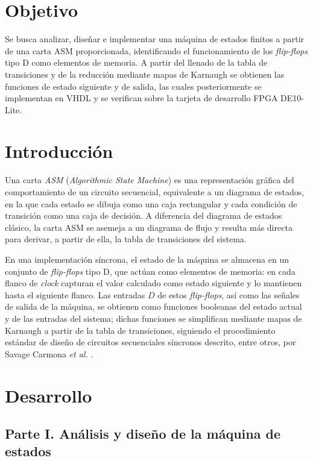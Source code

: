 \setcounter{page}{1}

\section{Objetivo}

Se busca analizar, diseñar e implementar una máquina de estados finitos a partir de una
carta ASM proporcionada, identificando el funcionamiento de los \textit{flip-flops} tipo
D como elementos de memoria. A partir del llenado de la tabla de transiciones y de la
reducción mediante mapas de Karnaugh se obtienen las funciones de estado siguiente y de
salida, las cuales posteriormente se implementan en VHDL y se verifican sobre la tarjeta
de desarrollo FPGA DE10-Lite.

\section{Introducción}

Una carta \textit{ASM} (\textit{Algorithmic State Machine}) es una representación
gráfica del comportamiento de un circuito secuencial, equivalente a un diagrama de
estados, en la que cada estado se dibuja como una caja rectangular y cada condición de
transición como una caja de decisión. A diferencia del diagrama de estados clásico, la
carta ASM se asemeja a un diagrama de flujo y resulta más directa para derivar, a partir
de ella, la tabla de transiciones del sistema.

En una implementación síncrona, el estado de la máquina se almacena en un conjunto de
\textit{flip-flops} tipo D, que actúan como elementos de memoria: en cada flanco de
\textit{clock} capturan el valor calculado como estado siguiente y lo mantienen hasta el
siguiente flanco. Las entradas $D$ de estos \textit{flip-flops}, así como las señales de
salida de la máquina, se obtienen como funciones booleanas del estado actual y de las
entradas del sistema; dichas funciones se simplifican mediante mapas de Karnaugh a
partir de la tabla de transiciones, siguiendo el procedimiento estándar de diseño de
circuitos secuenciales síncronos descrito, entre otros, por Savage Carmona \emph{et al.}
\cite{savage}.

\section{Desarrollo}

\subsection{Parte I. Análisis y diseño de la máquina de estados}

